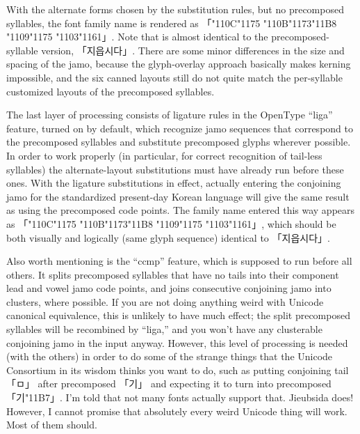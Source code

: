 \documentclass[14pt]{extarticle}
\begin{document}
With the alternate forms chosen by the substitution rules, but no
precomposed syllables, the font
family name is rendered as
{
「\char"110C\char"1175%
\char"110B\char"1173\char"11B8%
\char"1109\char"1175%
\char"1103\char"1161」}.
Note that is almost identical to the
precomposed-syllable version, {\dodum 「지읍시다」}.  There are some minor
differences in the size and spacing of the jamo, because the
glyph-overlay approach basically makes kerning impossible, and the six
canned layouts still do not quite match the per-syllable customized layouts
of the precomposed syllables.

The last layer of processing consists of ligature rules in the OpenType
``liga'' feature, turned on by default, which recognize jamo sequences that
correspond to the precomposed syllables and substitute precomposed glyphs
wherever possible.  In order to work properly (in particular, for correct
recognition of tail-less syllables) the alternate-layout substitutions must
have already run before these ones.  With the ligature substitutions in
effect, actually entering the conjoining jamo for the
standardized present-day Korean language will give the same result as using
the precomposed code points.  The family name entered this way appears as
{\dodum 「\char"110C\char"1175%
\char"110B\char"1173\char"11B8%
\char"1109\char"1175%
\char"1103\char"1161」}, which should be both visually and logically
(same glyph sequence) identical to {\dodum 「지읍시다」}.

Also worth mentioning is the ``ccmp'' feature, which is supposed to run
before all others.  It splits precomposed syllables that have no tails into
their component lead and vowel jamo code points, and joins consecutive
conjoining jamo into clusters, where possible.  If you are not doing
anything weird with Unicode canonical equivalence, this is unlikely to have
much effect; the split precomposed syllables will be recombined by ``liga,''
and you won't have any clusterable conjoining jamo in the input anyway. 
However, this level of processing is needed (with the others) in order to do
some of the strange things that the Unicode Consortium in its wisdom
thinks you want to do, such as putting conjoining tail {\dodum 「ㅁ」} after
precomposed {\dodum 「기」} and expecting it to turn into precomposed
{\dodum 「기\char"11B7」}.  I'm told that not many fonts actually support
that.  Jieubsida does!  However, I cannot promise that absolutely every
weird Unicode thing will work.  Most of them should.
\end{document}
